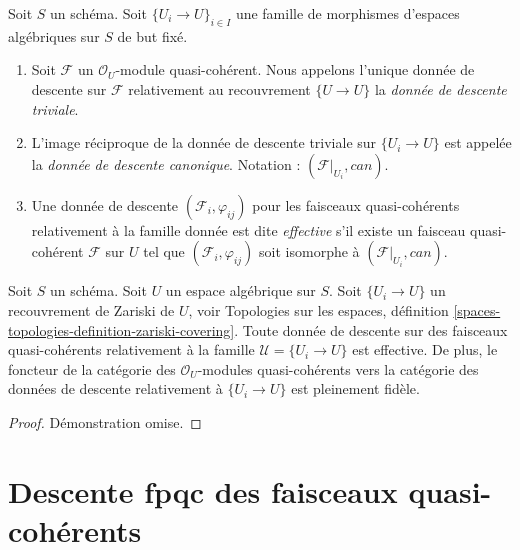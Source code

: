 \begin{definition}
\label{definition-descent-datum-effective-quasi-coherent}
Soit $S$ un schéma.
Soit $\{U_i \to U\}_{i \in I}$ une famille de morphismes d'espaces algébriques
sur $S$ de but fixé.
\begin{enumerate}
\item Soit $\mathcal{F}$ un $\mathcal{O}_U$-module quasi-cohérent.
Nous appelons l'unique donnée de descente sur $\mathcal{F}$ relativement au recouvrement
$\{U \to U\}$ la {\it donnée de descente triviale}.
\item L'image réciproque de la donnée de descente triviale sur
$\{U_i \to U\}$ est appelée la {\it donnée de descente canonique}.
Notation : $(\mathcal{F}|_{U_i}, can)$.
\item Une donnée de descente $(\mathcal{F}_i, \varphi_{ij})$
pour les faisceaux quasi-cohérents relativement à la famille donnée
est dite {\it effective} s'il existe un faisceau quasi-cohérent
$\mathcal{F}$ sur $U$ tel que $(\mathcal{F}_i, \varphi_{ij})$
soit isomorphe à $(\mathcal{F}|_{U_i}, can)$.
\end{enumerate}
\end{definition}

\begin{lemma}
\label{lemma-zariski-descent-effective}
Soit $S$ un schéma. Soit $U$ un espace algébrique sur $S$.
Soit $\{U_i \to U\}$ un recouvrement de Zariski de $U$, voir
Topologies sur les espaces,
définition \ref{spaces-topologies-definition-zariski-covering}.
Toute donnée de descente sur des faisceaux quasi-cohérents
relativement à la famille $\mathcal{U} = \{U_i \to U\}$ est
effective. De plus, le foncteur de la catégorie des
$\mathcal{O}_U$-modules quasi-cohérents vers la catégorie
des données de descente relativement à $\{U_i \to U\}$ est pleinement fidèle.
\end{lemma}

\begin{proof}
Démonstration omise.
\end{proof}












\section{Descente fpqc des faisceaux quasi-cohérents}
\label{section-fpqc-descent-quasi-coherent}

